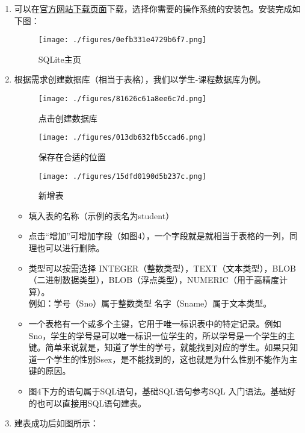 \begin{enumerate}
\item 可以在\href{https://sqlitebrowser.org/dl/}{官方网站下载页面}下载，选择你需要的操作系统的安装包。安装完成如下图：


\begin{figure}[ht]
\centering
\texttt{[image: ./figures/0efb331e4729b6f7.png]}
\caption{SQLite主页} \label{fig_SQLint_1}
\end{figure}

\item 根据需求创建数据库（相当于表格），我们以学生-课程数据库为例。

\begin{figure}[ht]
\centering
\texttt{[image: ./figures/81626c61a8ee6c7d.png]}
\caption{点击创建数据库} \label{fig_SQLint_2}
\end{figure}

\begin{figure}[ht]
\centering
\texttt{[image: ./figures/013db632fb5ccad6.png]}
\caption{保存在合适的位置} \label{fig_SQLint_3}
\end{figure}


\begin{figure}[ht]
\centering
\texttt{[image: ./figures/15dfd0190d5b237c.png]}
\caption{新增表} \label{fig_SQLint_5}
\end{figure}

\begin{itemize}
\item 填入表的名称（示例的表名为student）
\item 点击“增加”可增加字段（如图4），一个字段就是就相当于表格的一列，同理也可以进行删除。
\item 类型可以按需选择 INTEGER（整数类型），TEXT（文本类型），BLOB（二进制数据类型），BLOB（浮点类型），NUMERIC（用于高精度计算）。
\\例如：学号（Sno）属于整数类型  名字（Sname）属于文本类型。
\item 一个表格有一个或多个主键，它用于唯一标识表中的特定记录。例如Sno，学生的学号是可以唯一标识一位学生的，所以学号是一个学生的主键。简单来说就是，知道了学生的学号，就能找到对应的学生。如果只知道一个学生的性别Ssex，是不能找到的，这也就是为什么性别不能作为主键的原因。
\item 图4下方的语句属于SQL语句，基础SQL语句参考SQL 入门语法。基础好的也可以直接用SQL语句建表。
\end{itemize}
\item 建表成功后如图所示：


\end{enumerate}
